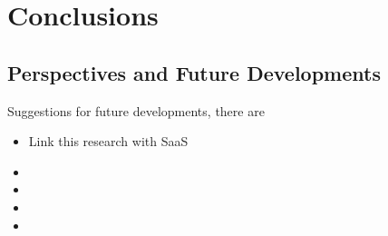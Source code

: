

\chapter*{Conclusions}


\section*{Perspectives and Future Developments}
Suggestions for future developments, there are

\begin{itemize}
	\item Link this research with SaaS
	\item %
	\item %
	\item %
	\item %
\end{itemize}
